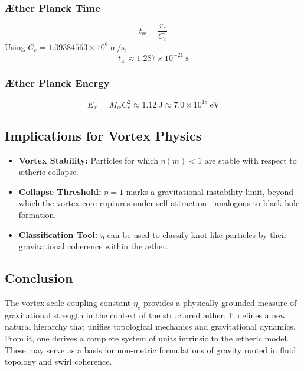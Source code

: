 \documentclass[12pt]{article}
\begin{document}
                \subsubsection*{Æther Planck Time}
                \begin{equation}
                t_{\text{\ae}} = \frac{r_c}{C_e}
                \end{equation}
                Using \( C_e = 1.09384563 \times 10^6~\text{m/s} \),
                \begin{equation}
                t_{\text{\ae}} \approx \boxed{1.287 \times 10^{-21}~\text{s}}
                \end{equation}

                \subsubsection*{Æther Planck Energy}
                \begin{equation}
                E_{\text{\ae}} = M_{\text{\ae}} C_e^2 \approx \boxed{1.12~\text{J}} \approx \boxed{7.0 \times 10^{18}~\text{eV}}
                \end{equation}

                \subsection*{Implications for Vortex Physics}

                \begin{itemize}
                    \item \textbf{Vortex Stability:} Particles for which \( \eta(m) < 1 \) are stable with respect to ætheric collapse.
                    \item \textbf{Collapse Threshold:} \( \eta = 1 \) marks a gravitational instability limit, beyond which the vortex core ruptures under self-attraction—analogous to black hole formation.
                    \item \textbf{Classification Tool:} \( \eta \) can be used to classify knot-like particles by their gravitational coherence within the æther.
                \end{itemize}

                \subsection*{Conclusion}

                The vortex-scale coupling constant \( \eta_e \) provides a physically grounded measure of gravitational strength in the context of the structured æther. It defines a new natural hierarchy that unifies topological mechanics and gravitational dynamics. From it, one derives a complete system of units intrinsic to the ætheric model. These may serve as a basis for non-metric formulations of gravity rooted in fluid topology and swirl coherence.
\end{document}
